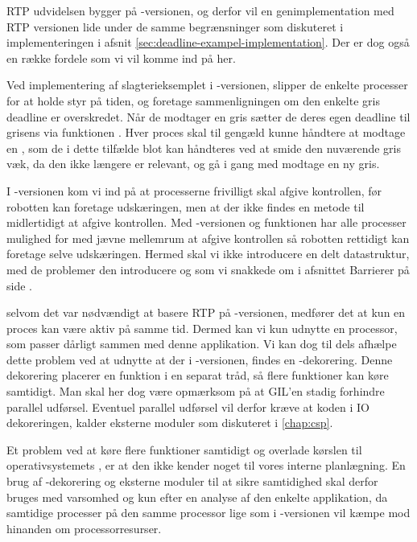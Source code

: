 RTP udvidelsen bygger på -versionen, og derfor vil en genimplementation med RTP versionen lide under de samme begrænsninger som diskuteret i implementeringen i afsnit \cref{sec:deadline-exampel-implementation}. Der er dog også en række fordele som vi vil komme ind på her.

Ved implementering af slagterieksemplet i -versionen, slipper de enkelte processer for at holde styr på tiden, og foretage sammenligningen om den enkelte gris deadline er overskredet. Når de modtager en gris sætter de deres egen deadline til grisens via funktionen .  Hver proces skal til gengæld kunne håndtere at modtage en , som de i dette tilfælde blot kan håndteres ved at smide den nuværende gris væk, da den ikke længere er relevant, og  gå i gang med modtage en ny gris.

I -versionen kom vi ind på at processerne frivilligt skal afgive kontrollen, før robotten kan foretage udskæringen, men at der ikke findes en metode til midlertidigt at afgive kontrollen. Med -versionen og funktionen  har alle processer mulighed for med jævne mellemrum at afgive kontrollen så robotten rettidigt kan foretage selve udskæringen. Hermed skal vi ikke introducere en delt datastruktur, med de problemer den introducere og som vi snakkede om i afsnittet Barrierer på side \pageref{sec:barrierer}.
  
selvom det var nødvændigt at basere RTP på  -versionen, medfører det at  kun en proces kan være aktiv på samme tid. Dermed kan vi kun udnytte en processor, som  passer dårligt sammen med denne applikation.  Vi kan dog til dels afhælpe dette problem ved at udnytte at der i -versionen, findes en -dekorering. Denne dekorering placerer en funktion i en separat tråd, så flere funktioner kan køre samtidigt. Man skal her dog være opmærksom på at GIL'en stadig forhindre parallel udførsel. Eventuel parallel udførsel vil derfor kræve at koden i IO dekoreringen, kalder eksterne moduler som diskuteret i \cref{chap:csp}. 

Et problem ved at køre flere funktioner samtidigt og overlade kørslen til operativsystemets \sched, er at den ikke kender noget til vores interne planlægning. En brug af -dekorering og eksterne moduler til at sikre samtidighed skal derfor bruges med varsomhed og kun efter en analyse af den enkelte applikation, da samtidige processer på den samme processor lige som i -versionen vil kæmpe mod hinanden om processorresurser. 
 
